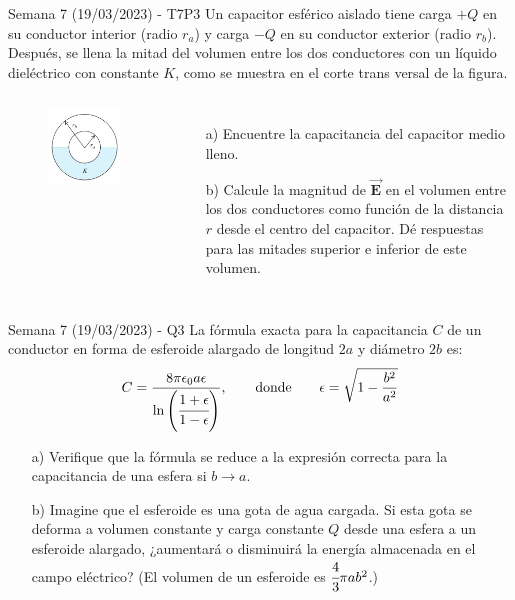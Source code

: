 \begin{frame}{Semana 7 (19/03/2023) - T7P3}
Un capacitor esférico aislado tiene carga $+Q$ en su conductor interior (radio $r_a$) y carga $-Q$ en su conductor exterior (radio $r_b$). Después, se llena la mitad del volumen entre los dos conductores con un líquido dieléctrico con constante $K$, como se muestra en el corte trans versal de la figura.

    \begin{columns}
        \begin{figure}[H]
        \centering
        \includegraphics[scale=0.4]{figures/t7p3.png}
    \end{figure}
    \begin{itemize}
        \item[a)] Encuentre la capacitancia del capacitor medio lleno.
        \item[b)] Calcule la magnitud de $\vec{\boldsymbol{E}}$ en el volumen entre los dos conductores como función de la distancia $r$ desde el centro del capacitor. Dé respuestas para las mitades superior e inferior de este volumen.
    \end{itemize}
    \end{columns}

\end{frame}

\begin{frame}{Semana 7 (19/03/2023) - Q3}
La fórmula exacta para la capacitancia $C$ de un conductor en forma de esferoide alargado de longitud $2a$ y diámetro $2b$ es: $$C=\frac{8\pi\epsilon_0 a\epsilon}{\ln\left(\cfrac{1+\epsilon}{1-\epsilon}\right)},\qquad \text{donde} \qquad \epsilon=\sqrt{1-\frac{b^2}{a^2}}$$

\begin{itemize}
    \item[a)] Verifique que la fórmula se reduce a la expresión correcta para la capacitancia de una esfera si $b \rightarrow a$.
    \item[b)] Imagine que el esferoide es una gota de agua cargada. Si esta gota se deforma a volumen constante y carga constante $Q$ desde una esfera a un esferoide alargado, ¿aumentará o disminuirá la energía almacenada en el campo eléctrico? (El volumen de un esferoide es $\cfrac{4}{3}\pi ab^2$.)
\end{itemize}

\end{frame}

